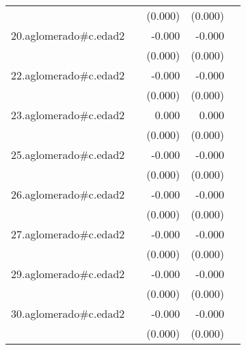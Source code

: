 {\begin{longtable}{l*{4}{D{.}{.}{-1}}}
            &                     &     (0.000)         &     (0.000)         &                     \\
\addlinespace
20.aglomerado#c.edad2&                     &      -0.000         &      -0.000         &                     \\
            &                     &     (0.000)         &     (0.000)         &                     \\
\addlinespace
22.aglomerado#c.edad2&                     &      -0.000         &      -0.000         &                     \\
            &                     &     (0.000)         &     (0.000)         &                     \\
\addlinespace
23.aglomerado#c.edad2&                     &       0.000         &       0.000         &                     \\
            &                     &     (0.000)         &     (0.000)         &                     \\
\addlinespace
25.aglomerado#c.edad2&                     &      -0.000         &      -0.000         &                     \\
            &                     &     (0.000)         &     (0.000)         &                     \\
\addlinespace
26.aglomerado#c.edad2&                     &      -0.000         &      -0.000         &                     \\
            &                     &     (0.000)         &     (0.000)         &                     \\
\addlinespace
27.aglomerado#c.edad2&                     &      -0.000         &      -0.000         &                     \\
            &                     &     (0.000)         &     (0.000)         &                     \\
\addlinespace
29.aglomerado#c.edad2&                     &      -0.000         &      -0.000         &                     \\
            &                     &     (0.000)         &     (0.000)         &                     \\
\addlinespace
30.aglomerado#c.edad2&                     &      -0.000         &      -0.000\sym{**} &                     \\
            &                     &     (0.000)         &     (0.000)         &                     \\

\end{longtable}}
